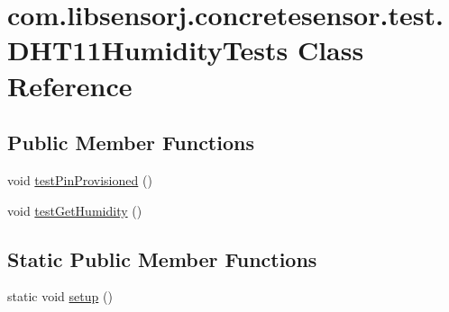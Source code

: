 \hypertarget{classcom_1_1libsensorj_1_1concretesensor_1_1test_1_1DHT11HumidityTests}{}\section{com.\+libsensorj.\+concretesensor.\+test.\+D\+H\+T11\+Humidity\+Tests Class Reference}
\label{classcom_1_1libsensorj_1_1concretesensor_1_1test_1_1DHT11HumidityTests}
\subsection*{Public Member Functions}
\begin{DoxyCompactItemize}
\item 
void \hyperlink{classcom_1_1libsensorj_1_1concretesensor_1_1test_1_1DHT11HumidityTests_aa430d9d41ff4c44bc96e26c56b766764}{test\+Pin\+Provisioned} ()
\item 
void \hyperlink{classcom_1_1libsensorj_1_1concretesensor_1_1test_1_1DHT11HumidityTests_a04e45fe8c38426fc82c1dceee5d87b71}{test\+Get\+Humidity} ()
\end{DoxyCompactItemize}
\subsection*{Static Public Member Functions}
\begin{DoxyCompactItemize}
\item 
static void \hyperlink{classcom_1_1libsensorj_1_1concretesensor_1_1test_1_1DHT11HumidityTests_aef0e68198d00aff7b82f1e71cf91f12d}{setup} ()
\end{DoxyCompactItemize}
